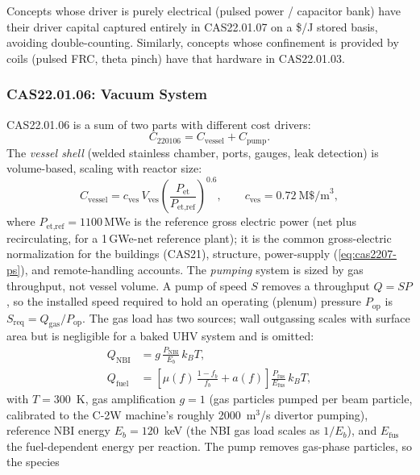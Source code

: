 \documentclass{article}
\begin{document}
Concepts whose driver is purely electrical (pulsed power / capacitor
bank) have their driver capital captured entirely in CAS22.01.07 on a
\$/J stored basis, avoiding double-counting. Similarly, concepts
whose confinement is provided by coils (pulsed FRC, theta pinch) have
that hardware in CAS22.01.03.

\subsubsection{CAS22.01.06: Vacuum System}
\label{sec:cas2206}

CAS22.01.06 is a sum of two parts with different cost drivers:
\begin{equation}
  C_{220106} = C_{\text{vessel}} + C_{\text{pump}}.
\end{equation}
The \emph{vessel shell} (welded stainless chamber, ports, gauges, leak
detection) is volume-based, scaling with reactor size:
\begin{equation}
  C_{\text{vessel}} = c_{\text{ves}}\, V_{\text{ves}} \left( \frac{P_{\text{et}}}{P_{\text{et,ref}}} \right)^{0.6}, \qquad c_{\text{ves}} = 0.72~\text{M\$/m}^3,
\end{equation}
where $P_{\text{et,ref}} = 1100$\,MWe is the reference gross electric power
(net plus recirculating, for a 1\,GWe-net reference plant); it is the
common gross-electric normalization for the buildings (CAS21), structure,
power-supply (\cref{eq:cas2207-ps}), and remote-handling accounts.
The \emph{pumping} system is sized by gas throughput, not vessel volume.
A pump of speed $S$ removes a throughput $Q = S P$, so the installed
speed required to hold an operating (plenum) pressure $P_{\text{op}}$ is
$S_{\text{req}} = Q_{\text{gas}}/P_{\text{op}}$. The gas load has two
sources; wall outgassing scales with surface area but is negligible for
a baked UHV system and is omitted:
\begin{align}
  Q_{\text{NBI}} &= g\, \frac{P_{\text{NBI}}}{E_b}\, k_B T, \\
  Q_{\text{fuel}} &= \left[ \mu(f)\, \frac{1 - f_b}{f_b} + a(f) \right] \frac{P_{\text{fus}}}{E_{\text{fus}}}\, k_B T,
\end{align}
with $T = 300$~K, gas amplification $g = 1$ (gas particles pumped per
beam particle, calibrated to the C-2W machine's roughly 2000~m$^3$/s
divertor pumping), reference NBI energy $E_b = 120$~keV (the NBI gas
load scales as $1/E_b$), and $E_{\text{fus}}$ the fuel-dependent energy
per reaction. The pump removes gas-phase particles, so the species
\end{document}
